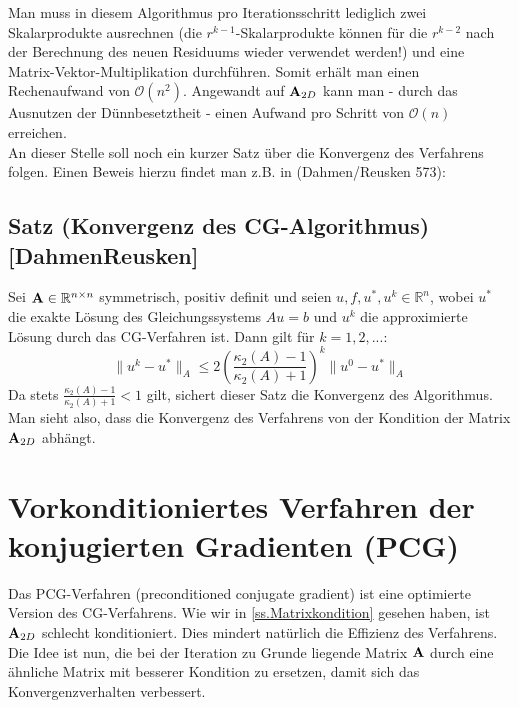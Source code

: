 Man muss in diesem Algorithmus pro Iterationsschritt lediglich zwei Skalarprodukte ausrechnen (die $r^{k-1}$-Skalarprodukte können für die $r^{k-2}$ nach der Berechnung des neuen Residuums wieder verwendet werden!) und eine Matrix-Vektor-Multiplikation durchführen. Somit erhält man einen Rechenaufwand von $\mathcal{O}(n^{2})$. Angewandt auf ${\textbf{A}}_{2D}$ kann man - durch das Ausnutzen der Dünnbesetztheit - einen Aufwand pro Schritt von $\mathcal{O}(n)$ erreichen. \\

An dieser Stelle soll noch ein kurzer Satz über die Konvergenz des Verfahrens folgen. Einen Beweis hierzu findet man z.B. in (Dahmen/Reusken 573):

\subsection{Satz (Konvergenz des CG-Algorithmus) [DahmenReusken]}\label{ss.Konvergenz CG}

Sei ${\textbf{A}} \in \mathbb{R}^{n \times n}$ symmetrisch, positiv definit und seien $u,f,u^{*},u^{k} \in \mathbb{R}^{n}$, wobei $u^{*}$ die exakte Lösung des Gleichungssystems $Au = b$ und $u^{k}$ die approximierte Lösung durch das CG-Verfahren ist. Dann gilt für $k = 1,2,...$:
\begin{equation}
\| u^{k} - u^{*} \|_{A} \le 2 \left( \frac {\kappa_{2} (A) - 1} {\kappa_{2} (A) + 1} \right)^{k} \| u^{0} - u^{*} \|_{A}
\end{equation}
Da stets $\frac {\kappa_{2} (A) - 1} {\kappa_{2} (A) + 1} < 1$ gilt, sichert dieser Satz die Konvergenz des Algorithmus. Man sieht also, dass die Konvergenz des Verfahrens von der Kondition der Matrix ${\textbf{A}}_{2D}$ abhängt. \\

\section{Vorkonditioniertes Verfahren der konjugierten Gradienten (PCG)}\label{s.PCG}

Das PCG-Verfahren (preconditioned conjugate gradient) ist eine optimierte Version des CG-Verfahrens. Wie wir in \autoref{ss.Matrixkondition} gesehen haben, ist ${\textbf{A}}_{2D}$ schlecht konditioniert. Dies mindert natürlich die Effizienz des Verfahrens. Die Idee ist nun, die bei der Iteration zu Grunde liegende Matrix ${\textbf{A}}$ durch eine ähnliche Matrix mit besserer Kondition zu ersetzen, damit sich das Konvergenzverhalten verbessert.

